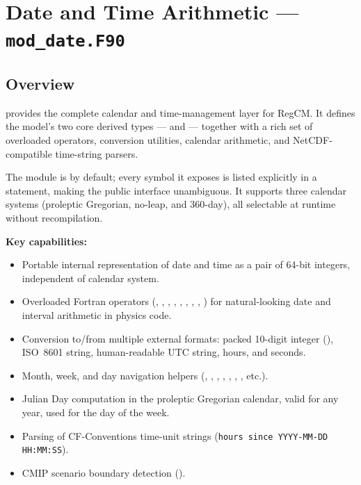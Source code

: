 \section{Date and Time Arithmetic --- \texttt{mod\_date.F90}}
\label{sec:moddate}

\subsection{Overview}

 provides the complete calendar and time-management layer for
RegCM. It defines the model's two core derived types --- 
and  --- together with a rich set of overloaded
operators, conversion utilities, calendar arithmetic, and NetCDF-compatible
time-string parsers.

The module is  by default; every symbol it exposes is listed
explicitly in a  statement, making the public interface unambiguous.
It supports three calendar systems (proleptic Gregorian, no-leap, and 360-day),
all selectable at runtime without recompilation.

\textbf{Key capabilities:}
\begin{itemize}
  \item Portable internal representation of date and time as a pair of 64-bit
        integers, independent of calendar system.
  \item Overloaded Fortran operators (\code{=}, \code{+}, \code{-},
        \code{==}, \code{/=}, \code{<}, \code{>}, \code{<=}, \code{>=})
        for natural-looking date and interval arithmetic in physics code.
  \item Conversion to/from multiple external formats: packed 10-digit integer
        (), ISO~8601 string, human-readable UTC string, hours,
        and seconds.
  \item Month, week, and day navigation helpers (, ,
        , , , ,
        , etc.).
  \item Julian Day computation in the proleptic Gregorian calendar, valid
        for any year, used for the day of the week.
  \item Parsing of CF-Conventions time-unit strings
        (\texttt{hours since YYYY-MM-DD HH:MM:SS}).
  \item CMIP scenario boundary detection ().
\end{itemize}

